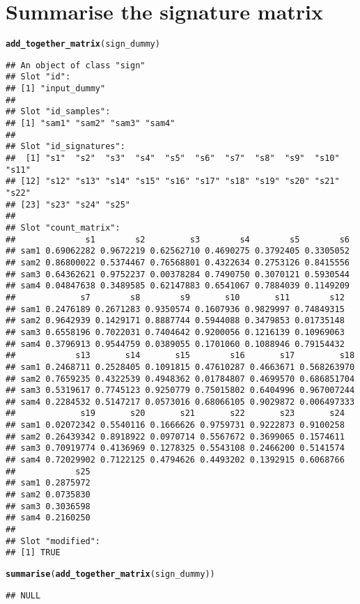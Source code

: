\documentclass{article}\usepackage[]{graphicx}\usepackage[]{color}
\makeatletter
\newcommand{\hlstd}[1]{\textcolor[rgb]{0.345,0.345,0.345}{#1}}%
\newcommand{\hlkwd}[1]{\textcolor[rgb]{0.737,0.353,0.396}{\textbf{#1}}}%
\newenvironment{kframe}{%
 \def\at@end@of@kframe{}%
 \ifinner\ifhmode%
  \def\at@end@of@kframe{\end{minipage}}%
  \begin{minipage}{\columnwidth}%
 \fi\fi%
 \def\FrameCommand##1{\hskip\@totalleftmargin \hskip-\fboxsep
 \colorbox{shadecolor}{##1}\hskip-\fboxsep
     \hskip-\linewidth \hskip-\@totalleftmargin \hskip\columnwidth}%
 \MakeFramed {\advance\hsize-\width
   \@totalleftmargin\z@ \linewidth\hsize
   \@setminipage}}%
 {\par\unskip\endMakeFramed%
 \at@end@of@kframe}
\newenvironment{knitrout}{}{} %
\makeatother
\begin{document}
\section{Summarise the signature matrix}
\begin{knitrout}
\color{fgcolor}\begin{kframe}
\begin{alltt}
\hlkwd{add_together_matrix}\hlstd{(sign_dummy)}
\end{alltt}
\begin{verbatim}
## An object of class "sign"
## Slot "id":
## [1] "input_dummy"
## 
## Slot "id_samples":
## [1] "sam1" "sam2" "sam3" "sam4"
## 
## Slot "id_signatures":
##  [1] "s1"  "s2"  "s3"  "s4"  "s5"  "s6"  "s7"  "s8"  "s9"  "s10" "s11"
## [12] "s12" "s13" "s14" "s15" "s16" "s17" "s18" "s19" "s20" "s21" "s22"
## [23] "s23" "s24" "s25"
## 
## Slot "count_matrix":
##              s1        s2         s3        s4        s5        s6
## sam1 0.69062282 0.9672219 0.62562710 0.4690275 0.3792405 0.3305052
## sam2 0.86800022 0.5374467 0.76568801 0.4322634 0.2753126 0.8415556
## sam3 0.64362621 0.9752237 0.00378284 0.7490750 0.3070121 0.5930544
## sam4 0.04847638 0.3489585 0.62147883 0.6541067 0.7884039 0.1149209
##             s7        s8        s9       s10       s11        s12
## sam1 0.2476189 0.2671283 0.9350574 0.1607936 0.9829997 0.74849315
## sam2 0.9642939 0.1429171 0.8887744 0.5944088 0.3479853 0.01735148
## sam3 0.6558196 0.7022031 0.7404642 0.9200056 0.1216139 0.10969063
## sam4 0.3796913 0.9544759 0.0389055 0.1701060 0.1088946 0.79154432
##            s13       s14       s15        s16       s17         s18
## sam1 0.2468711 0.2528405 0.1091815 0.47610287 0.4663671 0.568263970
## sam2 0.7659235 0.4322539 0.4948362 0.01784807 0.4699570 0.686851704
## sam3 0.5319617 0.7745123 0.9250779 0.75015802 0.6404996 0.967007244
## sam4 0.2284532 0.5147217 0.0573016 0.68066105 0.9029872 0.006497333
##             s19       s20       s21       s22       s23       s24
## sam1 0.02072342 0.5540116 0.1666626 0.9759731 0.9222873 0.9100258
## sam2 0.26439342 0.8918922 0.0970714 0.5567672 0.3699065 0.1574611
## sam3 0.70919774 0.4136969 0.1278325 0.5543108 0.2466200 0.5141574
## sam4 0.72029902 0.7122125 0.4794626 0.4493202 0.1392915 0.6068766
##            s25
## sam1 0.2875972
## sam2 0.0735830
## sam3 0.3036598
## sam4 0.2160250
## 
## Slot "modified":
## [1] TRUE
\end{verbatim}
\begin{alltt}
\hlkwd{summarise}\hlstd{(}\hlkwd{add_together_matrix}\hlstd{(sign_dummy))}
\end{alltt}
\begin{verbatim}
## NULL
\end{verbatim}
\end{kframe}
\end{knitrout}
\end{document}

